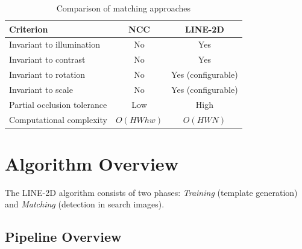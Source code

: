 \documentclass[12pt,a4paper]{article}
\begin{document}
\begin{table}[H]
  \centering
  \caption{Comparison of matching approaches}
  \label{tab:comparison}
  \begin{tabular}{lcc}
    \toprule
    \textbf{Criterion}              & \textbf{NCC}          & \textbf{LINE-2D}      \\
    \midrule
    Invariant to illumination       & No                    & Yes                   \\
    Invariant to contrast           & No                    & Yes                   \\
    Invariant to rotation           & No                    & Yes (configurable)    \\
    Invariant to scale              & No                    & Yes (configurable)    \\
    Partial occlusion tolerance     & Low                   & High                  \\
    Computational complexity        & $O(HWhw)$             & $O(HWN)$              \\
    \bottomrule
  \end{tabular}
\end{table}

\section{Algorithm Overview}

The LINE-2D algorithm consists of two phases: \emph{Training} (template generation)
and \emph{Matching} (detection in search images).

\subsection{Pipeline Overview}
\end{document}
